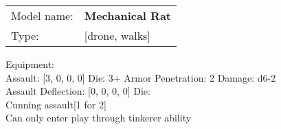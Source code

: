\begin{tabular}{ll}
Model name: & {\bf Mechanical Rat } \\
Type: & [drone, walks] \\
\end{tabular}

Equipment:  \\

Assault: [3, 0, 0, 0] Die: 3+ Armor Penetration: 2 Damage: d6-2 \\
Assault Deflection: [0, 0, 0, 0] Die: \\
\indent Cunning assault[1 for 2]\\ 
 

Can only enter play through tinkerer ability\\ 


 















